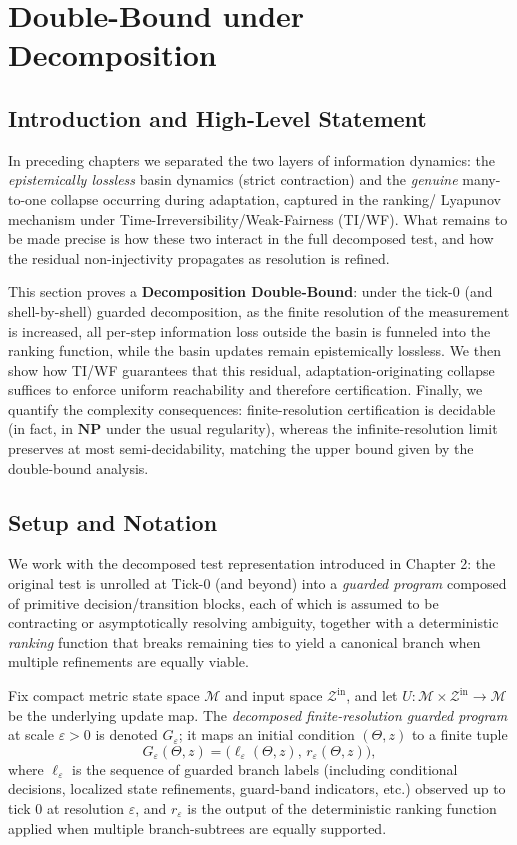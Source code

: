 \documentclass[12pt]{article}
\theoremstyle{definition}
\theoremstyle{plain}
\begin{document}
\section{Double-Bound under Decomposition}
\label{sec:double-bound-decomp}
\subsection{Introduction and High-Level Statement}
In preceding chapters we separated the two layers of information dynamics: the \emph{epistemically lossless} basin dynamics (strict contraction) and the \emph{genuine} many-to-one collapse occurring during adaptation, captured in the ranking/ Lyapunov mechanism under Time-Irreversibility/Weak-Fairness (TI/WF). What remains to be made precise is how these two interact in the full decomposed test, and how the residual non-injectivity propagates as resolution is refined.

This section proves a \textbf{Decomposition Double-Bound}: under the tick-0 (and shell-by-shell) guarded decomposition, as the finite resolution of the measurement is increased, all per-step information loss outside the basin is funneled into the ranking function, while the basin updates remain epistemically lossless. We then show how TI/WF guarantees that this residual, adaptation-originating collapse suffices to enforce uniform reachability and therefore certification. Finally, we quantify the complexity consequences: finite-resolution certification is decidable (in fact, in \(\mathbf{NP}\) under the usual regularity), whereas the infinite-resolution limit preserves at most semi-decidability, matching the upper bound given by the double-bound analysis.
\subsection{Setup and Notation}
\label{sub:dbd-setup}

We work with the decomposed test representation introduced in Chapter 2: the original test is unrolled at Tick-0 (and beyond) into a \emph{guarded program} composed of primitive decision/transition blocks, each of which is assumed to be contracting or asymptotically resolving ambiguity, together with a deterministic \emph{ranking} function that breaks remaining ties to yield a canonical branch when multiple refinements are equally viable.

Fix compact metric state space \(\mathcal M\) and input space \(\mathcal Z^{\mathrm{in}}\), and let \(U:\mathcal M\times\mathcal Z^{\mathrm{in}}\to\mathcal M\) be the underlying update map. The \emph{decomposed finite-resolution guarded program} at scale \(\varepsilon>0\) is denoted \(G_\varepsilon\); it maps an initial condition \((\Theta,z)\) to a finite tuple
\[
G_\varepsilon(\Theta,z)
=
\bigl(\ell_\varepsilon(\Theta,z),\, r_\varepsilon(\Theta,z)\bigr),
\]
where \(\ell_\varepsilon\) is the sequence of guarded branch labels (including conditional decisions, localized state refinements, guard-band indicators, etc.) observed up to tick 0 at resolution \(\varepsilon\), and \(r_\varepsilon\) is the output of the deterministic ranking function applied when multiple branch-subtrees are equally supported.
\end{document}
